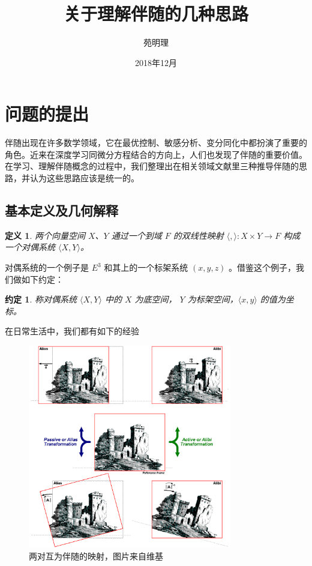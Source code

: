 \documentclass[a4paper,12pt]{article}
\title{关于理解伴随的几种思路}
\author{苑明理}
\date{2018年12月}
\newtheorem{definition}{定义}
\newtheorem{convention}{约定}
\begin{document}
\maketitle{}

\renewcommand\contentsname{目录}
\setcounter{tocdepth}{2}
\tableofcontents

\newpage

\section{问题的提出}

伴随出现在许多数学领域，它在最优控制、敏感分析、变分同化中都扮演了重要的角色。近来在深度学习同微分方程结合的方向上，人们也发现了伴随的重要价值。
在学习、理解伴随概念的过程中，我们整理出在相关领域文献里三种推导伴随的思路，并认为这些思路应该是统一的。

\subsection{基本定义及几何解释}

\begin{definition}
\label{d0}
两个向量空间 $X$、$Y$ 通过一个到域 $ F $ 的双线性映射 $ \langle , \rangle : X \times Y \to F $ 构成一个对偶系统 $ \langle X, Y \rangle $。
\end{definition}

对偶系统的一个例子是 $ E^3 $ 和其上的一个标架系统 $ (x, y, z) $ 。借鉴这个例子，我们做如下约定：

\begin{convention}
称对偶系统 $ \langle X, Y \rangle $ 中的 $ X $ 为底空间， $ Y $ 为标架空间，$ \langle x, y \rangle $ 的值为坐标。
\end{convention}

在日常生活中，我们都有如下的经验

\begin{figure}[ht]
\centering
\includegraphics[width=3.5in]{images/adjoint/alias_and_alibi.png}
\caption{两对互为伴随的映射，图片来自维基}
\end{figure}
\end{document}
